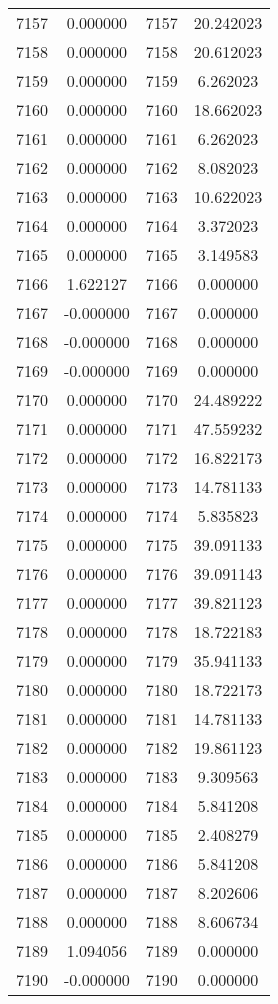 \documentclass[12pt]{article}
\begin{document}
\begin{longtable}{@{}cccc@{}}
7157 & 0.000000 & 7157 & 20.242023 \\
7158 & 0.000000 & 7158 & 20.612023 \\
7159 & 0.000000 & 7159 & 6.262023 \\
7160 & 0.000000 & 7160 & 18.662023 \\
7161 & 0.000000 & 7161 & 6.262023 \\
7162 & 0.000000 & 7162 & 8.082023 \\
7163 & 0.000000 & 7163 & 10.622023 \\
7164 & 0.000000 & 7164 & 3.372023 \\
7165 & 0.000000 & 7165 & 3.149583 \\
7166 & 1.622127 & 7166 & 0.000000 \\
7167 & -0.000000 & 7167 & 0.000000 \\
7168 & -0.000000 & 7168 & 0.000000 \\
7169 & -0.000000 & 7169 & 0.000000 \\
7170 & 0.000000 & 7170 & 24.489222 \\
7171 & 0.000000 & 7171 & 47.559232 \\
7172 & 0.000000 & 7172 & 16.822173 \\
7173 & 0.000000 & 7173 & 14.781133 \\
7174 & 0.000000 & 7174 & 5.835823 \\
7175 & 0.000000 & 7175 & 39.091133 \\
7176 & 0.000000 & 7176 & 39.091143 \\
7177 & 0.000000 & 7177 & 39.821123 \\
7178 & 0.000000 & 7178 & 18.722183 \\
7179 & 0.000000 & 7179 & 35.941133 \\
7180 & 0.000000 & 7180 & 18.722173 \\
7181 & 0.000000 & 7181 & 14.781133 \\
7182 & 0.000000 & 7182 & 19.861123 \\
7183 & 0.000000 & 7183 & 9.309563 \\
7184 & 0.000000 & 7184 & 5.841208 \\
7185 & 0.000000 & 7185 & 2.408279 \\
7186 & 0.000000 & 7186 & 5.841208 \\
7187 & 0.000000 & 7187 & 8.202606 \\
7188 & 0.000000 & 7188 & 8.606734 \\
7189 & 1.094056 & 7189 & 0.000000 \\
7190 & -0.000000 & 7190 & 0.000000 \\

\end{longtable}
\end{document}
